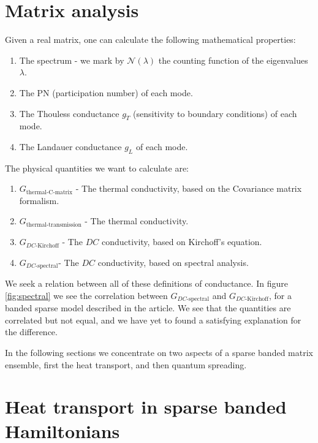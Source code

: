 \section{Matrix analysis}


Given a real matrix, one can calculate the following
mathematical properties:
\begin{enumerate}
  \item  The spectrum -  we mark by $\mathcal{N}(\lambda)$ 
         the counting function of the eigenvalues $\lambda$.
  \item  The PN (participation number) of each mode.
  \item  The Thouless conductance $g_T$ (sensitivity to boundary conditions)
        of each mode.
  \item  The Landauer conductance $g_L$ of each mode.
\end{enumerate}
The physical quantities we want to calculate are:
\begin{enumerate}[   a. ]
\item  $G_{\textrm{thermal-C-matrix}}$ - The thermal conductivity, based
       on the Covariance matrix formalism.
\item  $G_{\textrm{thermal-transmission}}$ - The thermal conductivity. 
\item  $G_{DC\textrm{-Kirchoff}}$ - The $DC$ conductivity, based 
       on Kirchoff's equation.
\item  $G_{DC\textrm{-spectral}}$-  The $DC$ conductivity, based 
       on spectral analysis.
\end{enumerate}

We seek a relation between all of these definitions of conductance. 
%
In figure \autoref{fig:spectral} we see the correlation 
between $G_{DC\textrm{-spectral}}$ and $G_{DC\textrm{-Kirchoff}}$, for a banded
sparse model described in the article. We see that the quantities are
correlated but not equal, and we have yet to found a satisfying explanation for the difference.

 In the
following sections we concentrate on two aspects of a sparse banded matrix ensemble,
first the heat transport, and then quantum spreading.

\section{Heat transport in sparse banded Hamiltonians}\label{sec:PTA}


